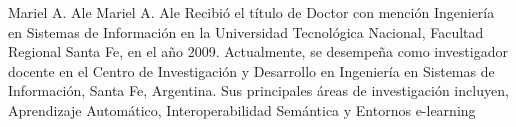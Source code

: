 \documentclass[journal]{IEEEtran}
\begin{document}


\begin{IEEEbiography}{Mariel A. Ale}
Mariel A. Ale Recibió el título de Doctor con mención Ingeniería en Sistemas de Información en la Universidad Tecnológica Nacional, Facultad Regional Santa Fe, en el año 2009. Actualmente, se desempeña como investigador docente en el Centro de Investigación y Desarrollo en Ingeniería en Sistemas de Información, Santa Fe, Argentina. Sus principales áreas de investigación incluyen, Aprendizaje Automático, Interoperabilidad Semántica y Entornos e-learning
\end{IEEEbiography}






\end{document}
